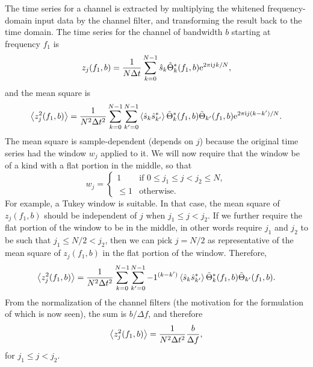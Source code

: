 \documentclass[10pt]{article}
\begin{document}
The time series for a channel is extracted by multiplying the whitened
frequency-domain input data by the channel filter, and transforming the
result back to the time domain.  The time series for the channel of
bandwidth \(b\) starting at frequency \(f_{1}\) is
\begin{equation}
\label{eqn1}
z_{j}(f_{1}, b)
   = \frac{1}{N \Delta t} \sum_{k = 0}^{N - 1} \hat{s}_{k}
   \tilde{\Theta}^{*}_{k}(f_{1}, b) \mathrm{e}^{2 \pi \mathrm{i} j k / N},
\end{equation}
and the mean square is
\begin{equation}
\left\langle z_{j}^{2}(f_{1}, b)\right\rangle
   = \frac{1}{N^{2} \Delta t^{2}} \sum_{k = 0}^{N - 1} \sum_{k' = 0}^{N -
   1} \left\langle\hat{s}_{k} \hat{s}^{*}_{k'}\right\rangle
   \tilde{\Theta}^{*}_{k}(f_{1}, b) \tilde{\Theta}_{k'}(f_{1}, b) \mathrm{e}^{2
   \pi \mathrm{i} j (k - k') / N}.
\end{equation}
The mean square is sample-dependent (depends on \(j\)) because the original
time series had the window \(w_{j}\) applied to it.  We will now require
that the window be of a kind with a flat portion in the middle, so that
\begin{equation}
w_{j}
   = \begin{cases}
   1 & \text{if \(0 \leq j_{1} \leq j < j_{2} \leq N\)},
   \\
   \leq 1 & \text{otherwise}.
   \end{cases}
\end{equation}
For example, a Tukey window is suitable.  In that case, the mean square of
\(z_{j}(f_{1}, b)\) should be independent of \(j\) when \(j_{1} \leq j <
j_{2}\).  If we further require the flat portion of the window to be in the
middle, in other words require \(j_{1}\) and \(j_{2}\) to be such that
\(j_{1} \leq N / 2 < j_{2}\), then we can pick \(j = N / 2\) as
representative of the mean square of \(z_{j}(f_{1}, b)\) in the flat
portion of the window.  Therefore,
\begin{equation}
\left\langle z_{j}^{2}(f_{1}, b)\right\rangle
   = \frac{1}{N^{2} \Delta t^{2}} \sum_{k = 0}^{N - 1} \sum_{k' = 0}^{N -
   1} -1^{(k - k')} \left\langle\hat{s}_{k} \hat{s}^{*}_{k'}\right\rangle
   \tilde{\Theta}^{*}_{k}(f_{1}, b) \tilde{\Theta}_{k'}(f_{1}, b).
\end{equation}
From the normalization of the channel filters (the motivation for the
formulation of which is now seen), the sum is \(b / \Delta f\), and
therefore
\begin{equation}
\left\langle z_{j}^{2}(f_{1}, b)\right\rangle
   = \frac{1}{N^{2} \Delta t^{2}} \frac{b}{\Delta f},
\end{equation}
for \(j_{1} \leq j < j_{2}\).
\end{document}
